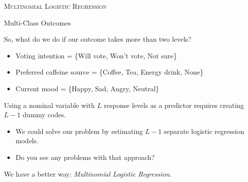 \documentclass{beamer}\usepackage[]{graphicx}\usepackage[]{color}
\begin{document}
\begin{frame}{}
  
  \begin{center}
    \Huge{\textsc{Multinomial Logistic Regression}}
  \end{center}
  
\end{frame}


\begin{frame}{Multi-Class Outcomes}
  
  So, what do we do if our outcome takes more than two levels?
  \begin{itemize}
    \item Voting intention = \{Will vote, Won't vote, Not sure\}
    \item Preferred caffeine source = \{Coffee, Tea, Energy drink, None\}
    \item Current mood = \{Happy, Sad, Angry, Neutral\}
  \end{itemize}
  \vb
  \pause
  Using a nominal variable with $L$ response levels as a predictor requires 
  creating $L - 1$ dummy codes.
  \vb
  \begin{itemize}
  \item We could solve our problem by estimating $L - 1$ separate logistic 
    regression models.
  \item Do you see any problems with that approach?
  \end{itemize}
  \vb
  \pause
  We have a better way: \emph{Multinomial Logistic Regression}.
  
\end{frame}

\end{document}
